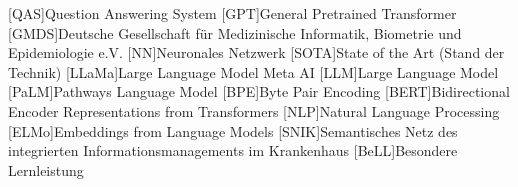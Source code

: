 \begin{acronym}[SPARQL]
    [QAS]{Question Answering System}
    [GPT]{General Pretrained Transformer}
    [GMDS]{Deutsche Gesellschaft für Medizinische Informatik, Biometrie und Epidemiologie e.V.}
    [NN]{Neuronales Netzwerk}
    [SOTA]{State of the Art (Stand der Technik)}
    [LLaMa]{Large Language Model Meta AI}
    [LLM]{Large Language Model}
    [PaLM]{Pathways Language Model}
    [BPE]{Byte Pair Encoding}
    [BERT]{Bidirectional Encoder Representations from Transformers}
    [NLP]{Natural Language Processing}
    [ELMo]{Embeddings from Language Models}
    [SNIK]{Semantisches Netz des integrierten Informationsmanagements im Krankenhaus}
    [BeLL]{Besondere Lernleistung}
\end{acronym}
